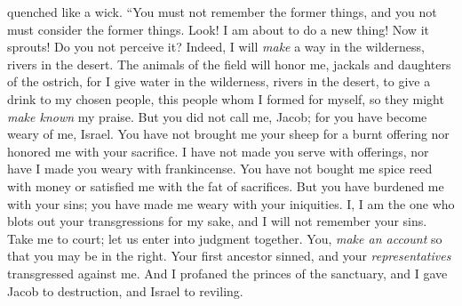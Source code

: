 \begin{biblechapter}
quenched like a wick.
\verse “You must not remember the former things, 
and you not must consider the former things.
\verse Look! I am about to do a new thing! Now it sprouts! 
Do you not perceive it? 
Indeed, I will \textit{make} a way in the wilderness, 
rivers in the desert.
\verse The animals of the field will honor me, 
jackals and daughters of the ostrich, 
for I give water in the wilderness, 
rivers in the desert, 
to give a drink to my chosen people,
\verse this people whom I formed for myself, 
so they might \textit{make known} my praise.
\verse But you did not call me, Jacob; 
for you have become weary of me, Israel.
\verse You have not brought me your sheep for a burnt offering 
nor honored me with your sacrifice. 
I have not made you serve with offerings, 
nor have I made you weary with frankincense.
\verse You have not bought me spice reed with money 
or satisfied me with the fat of sacrifices. 
But you have burdened me with your sins; 
you have made me weary with your iniquities.
\verse I, I am the one who blots out your transgressions for my sake, 
and I will not remember your sins.
\verse Take me to court; let us enter into judgment together. 
You, \textit{make an account} so that you may be in the right.
\verse Your first ancestor sinned, 
and your \textit{representatives} transgressed against me.
\verse And I profaned the princes of the sanctuary, 
and I gave Jacob to destruction, and Israel to reviling.
\end{biblechapter}

